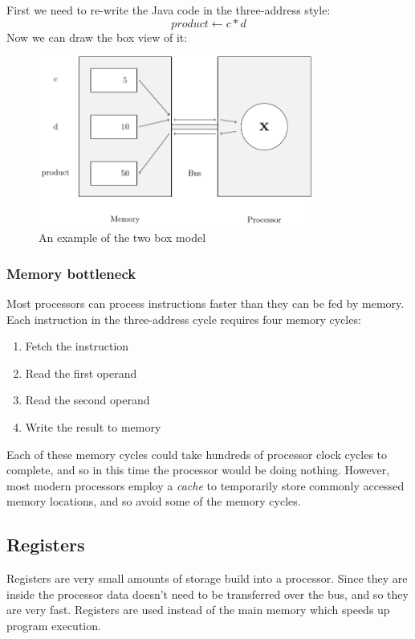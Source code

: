 \documentclass{article}
\begin{document}
First we need to re-write the Java code in the three-address style:
\[
	product \leftarrow c * d
\]
Now we can draw the box view of it:

\begin{figure}[ht!]
	\centering
	\includegraphics[width=90mm]{two_box_model_diagram.pdf}
	\caption{An example of the two box model}
	\label{overflow}
\end{figure}

\subsubsection{Memory bottleneck}
Most processors can process instructions faster than they can be fed by memory. Each instruction in the three-address cycle requires four memory cycles:

\begin{enumerate}
    \item Fetch the instruction
    \item Read the first operand
    \item Read the second operand
    \item Write the result to memory
\end{enumerate}

Each of these memory cycles could take hundreds of processor clock cycles to complete, and so in this time the processor would be doing nothing. However, most modern processors employ a {\it cache} to temporarily store commonly accessed memory locations, and so avoid some of the memory cycles. 

\subsection{Registers}
Registers are very small amounts of storage build into a processor. Since they are inside the processor data doesn't need to be transferred over the bus, and so they are very fast. Registers are used instead of the main memory which speeds up program execution.
\end{document}
